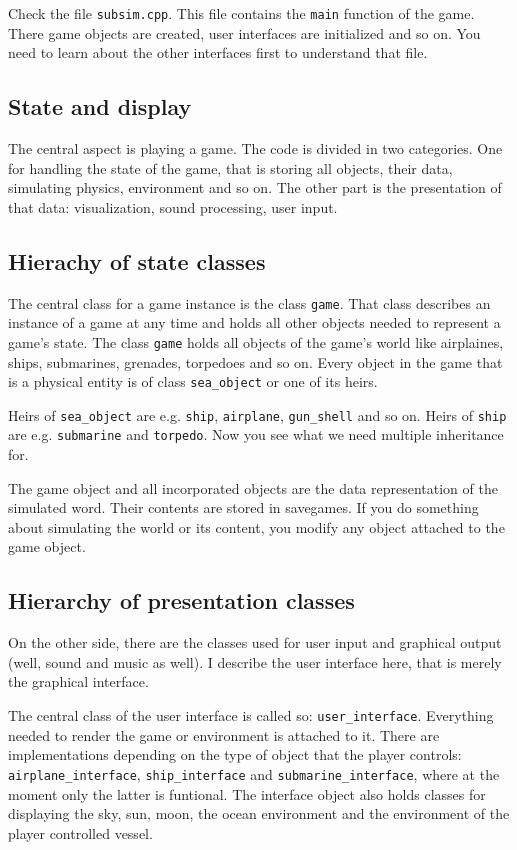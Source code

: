 \documentclass[english,a4paper,12pt]{report}
\begin{document}
Check the file \texttt{subsim.cpp}. This file contains the \texttt{main}
function of the game. There game objects are created, user interfaces
are initialized and so on. You need to learn about the other interfaces
first to understand that file.

\subsection{State and display}

The central aspect is playing a game. The code is divided in two
categories. One for handling the state of the game, that is storing all
objects, their data, simulating physics, environment and so on. The
other part is the presentation of that data: visualization, sound
processing, user input.

\subsection{Hierachy of state classes}

The central class for a game instance is the class \texttt{game}. That
class describes an instance of a game at any time and holds all other
objects needed to represent a game's state. The class \texttt{game}
holds all objects of the game's world like airplaines, ships,
submarines, grenades, torpedoes and so on. Every object in the game that
is a physical entity is of class \texttt{sea\_object} or one of its
heirs.

Heirs of \texttt{sea\_object} are e.g. \texttt{ship}, \texttt{airplane},
\texttt{gun\_shell} and so on. Heirs of \texttt{ship} are e.g.
\texttt{submarine} and \texttt{torpedo}. Now you see what we need
multiple inheritance for.

The game object and all incorporated objects are the data representation
of the simulated word. Their contents are stored in savegames. If you do
something about simulating the world or its content, you modify any
object attached to the game object.

\subsection{Hierarchy of presentation classes}

On the other side, there are the classes used for user input and
graphical output (well, sound and music as well). I describe the user
interface here, that is merely the graphical interface.

The central class of the user interface is called so:
\texttt{user\_interface}. Everything needed to render the game or
environment is attached to it. There are implementations depending on
the type of object that the player controls:
\texttt{airplane\_interface}, \texttt{ship\_interface} and
\texttt{submarine\_interface}, where at the moment only the latter is
funtional. The interface object also holds classes for displaying the
sky, sun, moon, the ocean environment and the environment of the player
controlled vessel.
\end{document}
